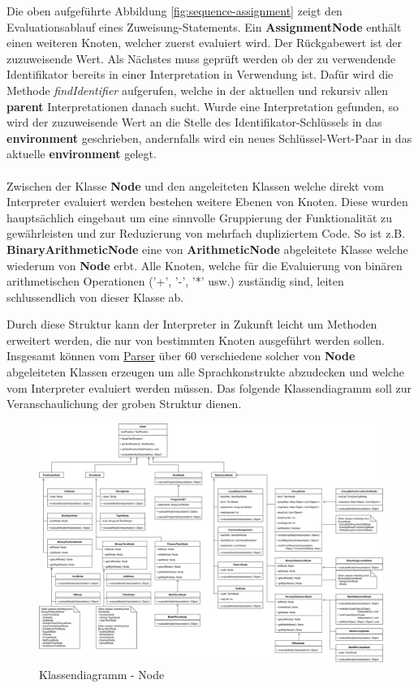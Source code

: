 Die oben aufgeführte Abbildung \ref{fig:sequence-assignment} zeigt den Evaluationsablauf eines Zuweisung-Statements. Ein \textbf{AssignmentNode} enthält einen weiteren Knoten, welcher zuerst evaluiert wird. Der Rückgabewert ist der zuzuweisende Wert. Als Nächstes muss geprüft werden ob der zu verwendende Identifikator bereits in einer Interpretation in Verwendung ist. Dafür wird die Methode \textit{findIdentifier} aufgerufen, welche in der aktuellen und rekursiv allen \textbf{parent} Interpretationen danach sucht. Wurde eine Interpretation gefunden, so wird der zuzuweisende Wert an die Stelle des Identifikator-Schlüssels in das \textbf{environment} geschrieben, andernfalls wird ein neues Schlüssel-Wert-Paar in das aktuelle \textbf{environment} gelegt.
\\\\
Zwischen der Klasse \textbf{Node} und den angeleiteten Klassen welche direkt vom Interpreter evaluiert werden bestehen weitere Ebenen von Knoten. Diese wurden hauptsächlich eingebaut um eine sinnvolle Gruppierung der Funktionalität zu gewährleisten und zur Reduzierung von mehrfach dupliziertem Code. So ist z.B. \textbf{BinaryArithmeticNode} eine von \textbf{ArithmeticNode} abgeleitete Klasse welche wiederum von \textbf{Node} erbt. Alle Knoten, welche für die Evaluierung von binären arithmetischen Operationen ('+', '-', '*' usw.) zuständig sind, leiten schlussendlich von dieser Klasse ab.

Durch diese Struktur kann der Interpreter in Zukunft leicht um Methoden erweitert werden, die nur von bestimmten Knoten ausgeführt werden sollen. 
Insgesamt können vom \underline{Parser} über 60 verschiedene solcher von \textbf{Node} abgeleiteten Klassen erzeugen um alle Sprachkonstrukte abzudecken und welche vom Interpreter evaluiert werden müssen. Das folgende Klassendiagramm soll zur Veranschaulichung der groben Struktur dienen. 
\begin{figure}[H]
\centering
	\includegraphics[width=1.1\textwidth]{images/NodeClassDiagram-1.png}\par\vspace{0.5cm}
	\caption{Klassendiagramm - Node}
\end{figure}

